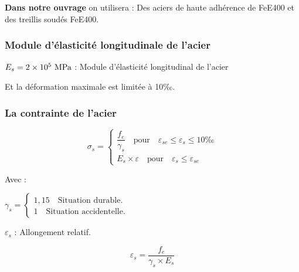 \documentclass[12pt,a4paper]{report}
\numberwithin{equation}{section}
\newcommand{\sgma}[1]{\sigma_{#1}}
\begin{document}
	\textbf{Dans notre ouvrage} on utilisera : Des aciers de haute adhérence de FeE400 et des treillis soudés FeE400.
	
	\subsubsection{Module d'élasticité longitudinale de l'acier}
	
	$E_{s} = \num{2e5}\mpa$ : Module d’élasticité longitudinal de l’acier
	
	\vspace{\baselineskip}
	
	Et la déformation maximale est limitée à 10‰.
	
	
	\subsubsection{La contrainte de l'acier}
	
	
	\begin{equation}
		\sgma{s} = \begin{cases}
			\dfrac{f_{e}}{\gamma_{s}} \quad\text{pour}\quad \varepsilon_{se} \leq \varepsilon_{s} \leq 10‰ \\
			E_{s} \times \varepsilon \quad\text{pour}\quad \varepsilon_{s} \leq \varepsilon_{se}
		\end{cases}
		\label{eq:contrainte-acier-elu}
	\end{equation}
	
	Avec :
	
	$\gamma_{s} = \begin{cases}
		1,15 \quad \text{Situation durable.} \\
		1 \quad \text{Situation accidentelle.}
	\end{cases}$
	
	\vspace{.3\baselineskip}
	
	$\varepsilon_{s}$ : Allongement relatif\footnotemark[2].
	
	
	\begin{equation}
		\varepsilon_{s} = \dfrac{f_{e}}{\gamma_{s} \times E_{s}}
		\label{eq:defromation-acier}
	\end{equation}
	
	\vspace{\baselineskip}
	
	
	
	
\end{document}
